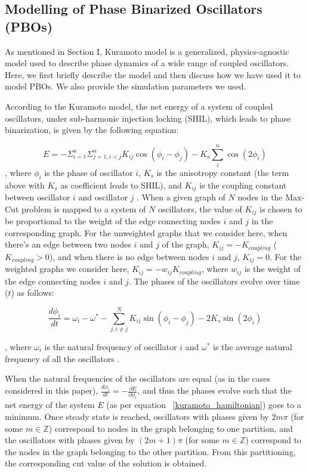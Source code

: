 \documentclass[%
 reprint,
 amsmath,amssymb,
 aps,
]{revtex4-2}
\begin{document}
\subsection{Modelling of Phase Binarized Oscillators (PBOs)}

As mentioned in Section I, Kuramoto model is a generalized, physics-agnostic model used to describe phase dynamics of a wide range of coupled oscillators. Here, we first briefly describe the model and then discuss how we have used it to model PBOs. We also provide the simulation parameters we used. 

According to the Kuramoto model, the net energy of a system of coupled oscillators, under sub-harmonic injection locking (SHIL), which leads to phase binarization, is given by the following equation:

\begin{equation}
E=-\Sigma_{i=1}^{n}\Sigma_{j=1,i < j}^{n}K_{ij}\cos(\phi_{i}-\phi_{j})-K_{s}\sum_{i}^{n}\cos (2\phi _{i})
\label{kuramoto_hamiltonian}
\end{equation}
, where $\phi_i$ is the phase of oscillator $i$, $K_s$ is the anisotropy constant (the term above with $K_s$ as coefficient leads to SHIL), and $K_{ij}$ is the coupling constant between oscillator $i$ and oscillator $j$ \citep{Spin_Liu}. When a given graph of $N$ nodes in the Max-Cut problem is mapped to a system of $N$ oscillators, the value of $K_{ij}$ is chosen to be proportional to the weight of the edge connecting nodes $i$ and $j$ in the corresponding graph. For the unweighted graphs that we consider here, when there's an edge between two nodes $i$ and $j$ of the graph, $K_{ij}=-K_{coupling}$ ($K_{coupling} >0$), and when there is no edge between nodes $i$ and $j$, $K_{ij} = 0$. For the weighted graphs we consider here, $K_{ij}=- w_{ij}K_{coupling}$, where $w_{ij}$ is the weight of the edge connecting nodes $i$ and $j$. The phases of the oscillators evolve over time ($t$) as follows:

\begin{equation}
\frac{d \phi_i}{dt}=\omega _{i}-\omega^{*} - \sum _{j,i\ne j}^{N}K_{ij}\sin (\phi _{i}-\phi_{j})-2K_{s}\sin (2\phi_{i})
\label{kuramoto_eqn}
\end{equation}

, where $\omega_i$ is the natural frequency of oscillator $i$ and $\omega^{*}$ is the average natural frequency of all the oscillators \citep{Spin_Liu}.

When the natural frequencies of the oscillators are equal (as in the cases considered in this paper), $\frac{d \phi_i}{dt} = -\frac{\partial E}{\partial \phi_i}$, and thus the phases evolve such that the net energy of the system $E$ (as per equation ~\ref{kuramoto_hamiltonian}) goes to a minimum. Once steady state is reached, oscillators with phases given by $2m\pi$ (for some $m\in \mathbb{Z}$) correspond to nodes in the graph belonging to one partition, and the oscillators with phases given by $(2m+1)\pi$ (for some $m\in \mathbb{Z}$) correspond to the nodes in the graph belonging to the other partition. From this partitioning, the corresponding cut value of the solution is obtained. 
\end{document}
